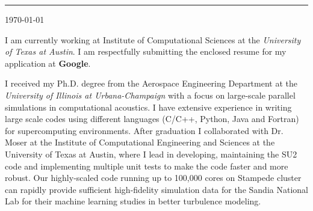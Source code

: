 \documentclass[11pt]{article}
\newcommand{\company}{\textbf{Google}}
\newcommand{\position}{\textit{software engineer }}
\begin{document}
\thispagestyle{empty}
%
%
\begin{minipage}[t]{0.45\textwidth}
\vspace{-0.5truein}
\end{minipage} 



%
%
\vspace{0.2truein}
\rule[0.8em]{\textwidth}{1.0pt} 

\noindent
\begin{minipage}[b]{0.7\textwidth}
\vspace{-0.35truein}
\noindent
\small
\begin{tabbing}
\end{tabbing}
\vspace{0pt}
\end{minipage} \hfill
\begin{minipage}[b]{0.7\textwidth}
\vspace{0pt}
\noindent
\begin{tabbing}
\today 
\end{tabbing}
\vspace{0pt}
\end{minipage} 
%
%




I am currently working at Institute of Computational Sciences at the \emph{University of Texas at Austin}.   I am respectfully submitting the enclosed resume for my application at \company. %

I received my Ph.D. degree from the Aerospace Engineering Department at the \emph{University of Illinois at Urbana-Champaign} with a focus on large-scale parallel simulations in computational acoustics.   I have extensive experience in writing large scale codes using different languages (C/C++, Python, Java and Fortran) for supercomputing environments.  After graduation I collaborated with Dr. Moser at the Institute of Computational Engineering and Sciences at the University of Texas at Austin, where I lead in developing, maintaining the SU2 code and implementing multiple unit tests to make the code faster and more robust.   Our highly-scaled code running up to 100,000 cores on Stampede cluster can rapidly provide sufficient high-fidelity simulation data for the Sandia National Lab for their machine learning studies in better turbulence modeling.  
\end{document}
